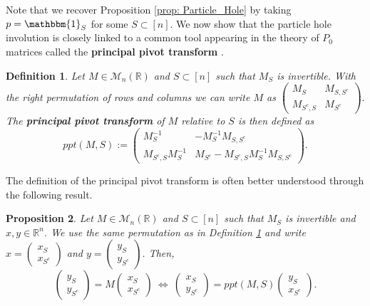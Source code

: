 \documentclass{article}
\numberwithin{equation}{section}
\newcommand{\bR}{\mathbb{R}}
\newcommand{\cara}[1]{\mathbbm{1}_{#1}}
\newcommand{\defeq}{:=}
\theoremstyle{plain}
\newtheorem{proposition}{Proposition}[section]
\newtheorem{definition}[proposition]{Definition}
\begin{document}
\noindent Note that we recover Proposition \ref{prop: Particle_Hole} by taking $p=\cara{S}$ for some $S\subset [n]$. We now show that the particle hole involution is closely linked to a common tool appearing in the theory of $P_0$ matrices called the \textbf{principal pivot transform} \cite{Tsatsomeros}.

\begin{definition}\label{def: PPT}
Let $M\in\mathcal{M}_n(\bR)$ and $S\subset [n]$ such that $M_S$ is invertible. With the right permutation of rows and columns we can write $M$ as $\begin{pmatrix} M_S & M_{S, S^c} \\
M_{S^c, S} & M_{S^c} \end{pmatrix}.$ The \textbf{principal pivot transform} of $M$ relative to $S$ is then defined as
\[ppt(M,S)\defeq\begin{pmatrix} M_S^{-1} & -M_S^{-1}M_{S, S^c} \\
M_{S^c, S}M_S^{-1} & M_{S^c} - M_{S^c, S}M_S^{-1}M_{S, S^c} \end{pmatrix}.\]
\end{definition}

\noindent The definition of the principal pivot transform is often better understood through the following result.

\begin{proposition}\label{prop: PPT_def_alternate}
Let $M\in\mathcal{M}_n(\bR)$ and $S\subset [n]$ such that $M_S$ is invertible and $x,y\in \bR^n$. We use the same permutation as in Definition \ref{def: PPT} and write $x=\begin{pmatrix} x_S \\ x_{S^c} \end{pmatrix}$ and $y=\begin{pmatrix} y_S \\ y_{S^c} \end{pmatrix}$. Then,
\[\begin{pmatrix} y_S \\ y_{S^c} \end{pmatrix} = M\begin{pmatrix} x_S \\ x_{S^c} \end{pmatrix}~\Leftrightarrow~\begin{pmatrix} x_S \\ y_{S^c} \end{pmatrix}=ppt(M,S)\begin{pmatrix} y_S \\ x_{S^c} \end{pmatrix}.\]
\end{proposition}
\end{document}
